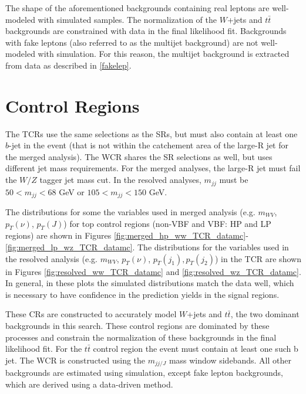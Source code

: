The shape of the aforementioned backgrounds containing real leptons are well-modeled with simulated samples. The normalization of the $W$+jets and $t\bar{t}$ backgrounds are constrained with data in the final likelihood fit. Backgrounds with fake leptons (also referred to as the multijet background) are not well-modeled with simulation. For this reason, the multijet background is extracted from data as described in \ref{fakelep}.

\section{Control Regions}
\label{crs}
The TCRs use the same selections as the SRs, but must also contain at least one $b$-jet in the event (that is not within the catchement area of the large-R jet for the merged analysis). The WCR shares the SR selections as well, but uses different jet mass requirements. For the merged analyses, the large-R jet must fail the $W/Z$ tagger jet mass cut. In the resolved analyses, $m_{jj}$ must be $50 < m_{jj} < 68$ GeV or $105 < m_{jj} < 150$ GeV. 

The distributions for some the variables used in merged analysis (e.g. $m_{WV}$, $p_{T}(\nu)$, $p_{T}(J)$) for top control regions (non-VBF and VBF: HP and LP regions) are shown in Figures \ref{fig:merged_hp_ww_TCR_datamc}-\ref{fig:merged_lp_wz_TCR_datamc}. The distributions for the variables used in the resolved analysis (e.g. $m_{WV}$, $p_{T}(\nu)$, $p_{T}(j_{1}), p_{T}(j_{2})$) in the TCR are shown in Figures \ref{fig:resolved_ww_TCR_datamc} and \ref{fig:resolved_wz_TCR_datamc}. In general, in these plots the simulated distributions match the data well, which is necessary to have confidence in the prediction yields in the signal regions.

These CRs are constructed to accurately model $W$+jets and $t\bar{t}$, the two dominant backgrounds in this search. These control regions are dominated by these processes and constrain the normalization of these backgrounds in the final likelihood fit. For the $t\bar{t}$ control region the event must contain at least one such b jet. The WCR is constructed using the $m_{jj/J}$ mass window sidebands. All other backgrounds are estimated using simulation, except fake lepton backgrounds, which are derived using a data-driven method.


